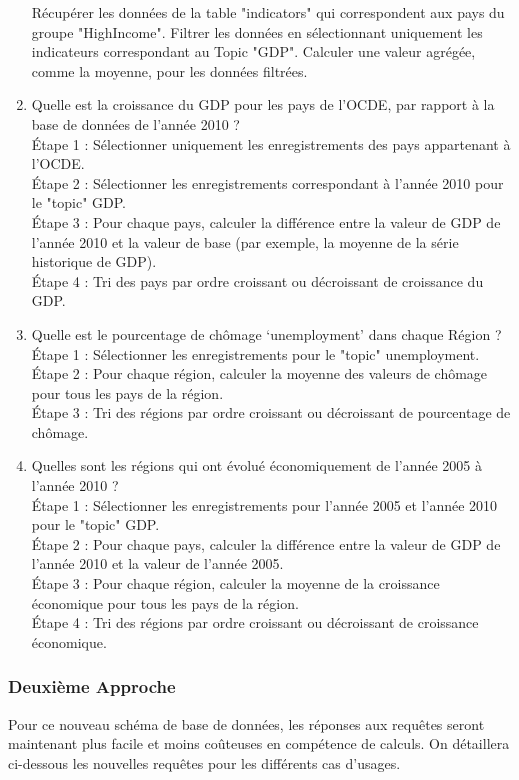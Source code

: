 \begin{enumerate}
Récupérer les données de la table "indicators" qui correspondent aux pays du groupe "HighIncome".
Filtrer les données en sélectionnant uniquement les indicateurs correspondant au Topic "GDP".
Calculer une valeur agrégée, comme la moyenne, pour les données filtrées.
\item Quelle est la croissance du GDP pour les pays de l’OCDE, par rapport à la base de données de l’année 2010 ?\\
Étape 1 : Sélectionner uniquement les enregistrements des pays appartenant à l'OCDE.\\
Étape 2 : Sélectionner les enregistrements correspondant à l'année 2010 pour le "topic" GDP.\\
Étape 3 : Pour chaque pays, calculer la différence entre la valeur de GDP de l'année 2010 et la valeur de base (par exemple, la moyenne de la série historique de GDP).\\
Étape 4 : Tri des pays par ordre croissant ou décroissant de croissance du GDP.\\
\item Quelle est le pourcentage de chômage ‘unemployment’ dans chaque Région ?\\
Étape 1 : Sélectionner les enregistrements pour le "topic" unemployment.\\
Étape 2 : Pour chaque région, calculer la moyenne des valeurs de chômage pour tous les pays de la région.\\
Étape 3 : Tri des régions par ordre croissant ou décroissant de pourcentage de chômage.\\
\item Quelles sont les régions qui ont évolué économiquement de l’année 2005 à l’année 2010 ?\\
Étape 1 : Sélectionner les enregistrements pour l'année 2005 et l'année 2010 pour le "topic" GDP.\\
Étape 2 : Pour chaque pays, calculer la différence entre la valeur de GDP de l'année 2010 et la valeur de l'année 2005.\\
Étape 3 : Pour chaque région, calculer la moyenne de la croissance économique pour tous les pays de la région.\\
Étape 4 : Tri des régions par ordre croissant ou décroissant de croissance économique.\\
\end{enumerate}

\subsubsection{Deuxième Approche}
Pour ce nouveau schéma de base de données, les réponses aux requêtes seront maintenant plus facile et moins coûteuses en compétence de calculs. On détaillera ci-dessous les nouvelles requêtes pour les différents cas d'usages. 

